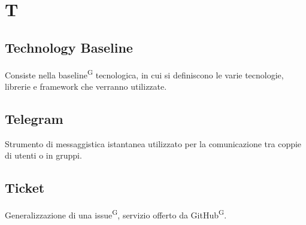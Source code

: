 \section{T}

\subsection{Technology Baseline}
Consiste nella baseline\textsuperscript{G} tecnologica, in cui si definiscono le varie tecnologie, librerie e framework che verranno utilizzate.


\subsection{Telegram}
Strumento di messaggistica istantanea utilizzato per la comunicazione tra coppie di utenti o in gruppi.



\subsection{Ticket}
Generalizzazione di una issue\textsuperscript{G}, servizio offerto da GitHub\textsuperscript{G}.





\clearpage